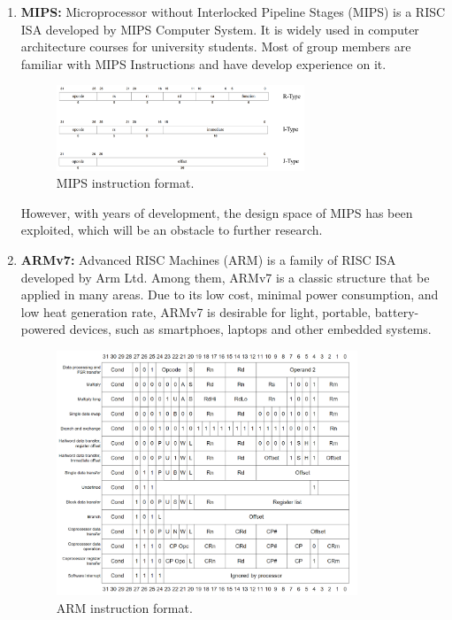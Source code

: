 \begin{enumerate}
\item \textbf{MIPS:} Microprocessor without Interlocked Pipeline Stages (MIPS) is a RISC ISA developed by MIPS Computer System. It is widely used in computer architecture courses for university students. Most of group members are familiar with MIPS Instructions and have develop experience on it.

\begin{figure}[!htp]
    \centering
    \includegraphics[width=0.7\textwidth]{figure/MIPS-instruction-format-18.png}
    \caption{MIPS instruction format\cite{mips_ist}.}
    \label{fig:mips_inst}
\end{figure}

However, with years of development, the design space of MIPS has been exploited, which will be an obstacle to further research.
\item \textbf{ARMv7:} Advanced RISC Machines (ARM) is a family of RISC ISA developed by Arm Ltd. Among them, ARMv7 is a classic structure that be applied in many areas. Due to its low cost, minimal power consumption, and low heat generation rate, ARMv7 is desirable for light, portable, battery-powered devices, such as smartphoes, laptops and other embedded systems.

\begin{figure}[!htp]
    \centering
    \includegraphics[width=0.85\textwidth]{figure/arm_ist.png}
    \caption{ARM instruction format\cite{arm_ist}.}
    \label{fig:arm_ist}
\end{figure}


\end{enumerate}
